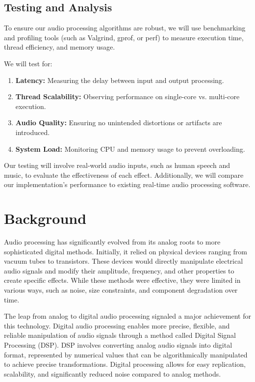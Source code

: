 \documentclass[conference]{IEEEtran}
\begin{document}
\subsection{Testing and Analysis}
To ensure our audio processing algorithms are robust, we will use benchmarking and profiling tools (such as Valgrind, gprof, or perf) to measure execution time, thread efficiency, and memory usage.

We will test for:
\begin{enumerate}
    \item \textbf{Latency:} Measuring the delay between input and output processing.
    \item \textbf{Thread Scalability:} Observing performance on single-core vs. multi-core execution.
    \item \textbf{Audio Quality:} Ensuring no unintended distortions or artifacts are introduced.
    \item \textbf{System Load:} Monitoring CPU and memory usage to prevent overloading.
\end{enumerate}

Our testing will involve real-world audio inputs, such as human speech and music, to evaluate the effectiveness of each effect. Additionally, we will compare our implementation's performance to existing real-time audio processing software.

\section{Background}

Audio processing has significantly evolved from its analog roots to more sophisticated digital methods\cite{bode1984}. Initially, it relied on physical devices ranging from vacuum tubes to transistors. These devices would directly manipulate electrical audio signals and modify their amplitude, frequency, and other properties to create specific effects. While these methods were effective, they were limited in various ways, such as noise, size constraints, and component degradation over time.

The leap from analog to digital audio processing signaled a major achievement for this technology\cite{moorer2000}. Digital audio processing enables more precise, flexible, and reliable manipulation of audio signals through a method called Digital Signal Processing (DSP). DSP involves converting analog audio signals into digital format, represented by numerical values that can be algorithmically manipulated to achieve precise transformations. Digital processing allows for easy replication, scalability, and significantly reduced noise compared to analog methods\cite{wilmering2020}.
\end{document}
